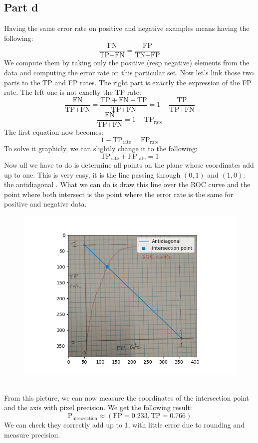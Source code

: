 \documentclass[a4paper, 10pt]{article}
\begin{document}
\subsection{Part d}
Having the same error rate on positive and negative examples means having the following:
$$
\frac{\text{FN}}{\text{TP}+\text{FN}} = \frac{\text{FP}}{\text{TN}+\text{FP}}
$$
We compute them by taking only the positive (resp negative) elements from the data
and computing the error rate on this particular set.
Now let's link those two parts to the TP and FP rates. The right part is exactly the expression
of the FP rate. The left one is not exaclty the TP rate:
$$
\frac{\text{FN}}{\text{TP}+\text{FN}} = \frac{\text{TP}+\text{FN} - \text{TP}}{\text{TP}+\text{FN}} = 1 - \frac{\text{TP}}{\text{TP}+\text{FN}}
$$
$$
\frac{\text{FN}}{\text{TP}+\text{FN}} = 1 - \text{TP}_\text{rate}
$$
The first equation now becomes:
$$
1 - \text{TP}_\text{rate} = \text{FP}_\text{rate}
$$
To solve it graphicly, we can slightly change it to the following:
$$
\text{TP}_\text{rate} + \text{FP}_\text{rate} = 1
$$
Now all we have to do is determine all points on the plane whose coordinates add up to one.
This is very easy, it is the line passing through $(0,1)$ and $(1,0)$: the antidiagonal . What we can do is 
draw this line over the ROC curve and the point where both intersect is the point where
the error rate is the same for positive and negative data. 
\\
\begin{figure}
\centering
	\includegraphics[scale=0.7]{ex2d}
\end{figure}
\\
From this picture, we can now measure the coordinates of the intersection point and the axis with pixel precision.
We get the following result:
$$
\text{P}_\text{intersection} \approx (\text{FP}=0.233, \text{TP}=0.766)
$$
We can check they correctly add up to 1, with little error due to rounding and measure precision.
\end{document}
